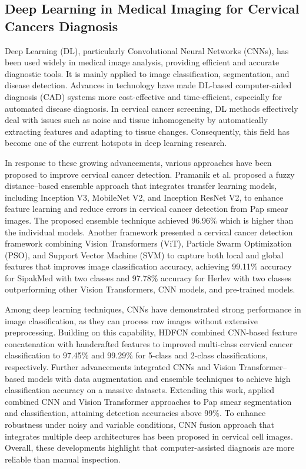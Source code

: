 \documentclass[pdflatex,sn-nature]{sn-jnl}%
\theoremstyle{thmstyleone}%
\theoremstyle{thmstyletwo}%
\theoremstyle{thmstylethree}%
\begin{document}
\subsection{Deep Learning in Medical Imaging for Cervical Cancers Diagnosis}

Deep Learning (DL), particularly Convolutional Neural Networks (CNNs), has been used widely in medical image analysis, providing efficient and accurate diagnostic tools. It is mainly applied to image classification, segmentation, and disease detection\cite{Lite7}. Advances in technology have made DL-based computer-aided diagnosis (CAD) systems more cost-effective and time-efficient, especially for automated disease diagnosis\cite{Lite8}. In cervical cancer screening, DL methods effectively deal with issues such as noise and tissue inhomogeneity by automatically extracting features and adapting to tissue changes\cite{Lite9}. Consequently, this field has become one of the current hotspots in deep learning research.

In response to these growing advancements, various approaches have been proposed to improve cervical cancer detection. Pramanik et al.\cite{Lite10} proposed a fuzzy distance–based ensemble approach that integrates transfer learning models, including Inception V3, MobileNet V2, and Inception ResNet V2, to enhance feature learning and reduce errors in cervical cancer detection from Pap smear images. The proposed ensemble technique achieved 96.96\% which is higher than the individual models. Another framework\cite{Lite11} presented a cervical cancer detection framework combining Vision Transformers (ViT), Particle Swarm Optimization (PSO), and Support Vector Machine (SVM) to capture both local and global features that improves image classification accuracy, achieving 99.11\% accuracy for SipakMed with two classes and 97.78\% accuracy for Herlev with two classes outperforming other Vision Transformers, CNN models, and pre-trained models. 

Among deep learning techniques, CNNs have demonstrated strong performance in image classification, as they can process raw images without extensive preprocessing. Building on this capability, HDFCN\cite{Lite12} combined CNN-based feature concatenation with handcrafted features to improved multi-class cervical cancer classification to 97.45\% and 99.29\% for 5-class and 2-class classifications, respectively. Further advancements integrated CNNs and Vision Transformer–based models with data augmentation and ensemble techniques to achieve high classification accuracy on a massive datasets\cite{Lite13}. Extending this work, \cite{Lite14}applied combined CNN and Vision Transformer approaches to Pap smear segmentation and classification, attaining detection accuracies above 99\%. To enhance robustness under noisy and variable conditions, CNN fusion approach that integrates multiple deep architectures has been proposed in cervical cell images\cite{Lite15}. Overall, these developments highlight that computer-assisted diagnosis are more reliable than manual inspection.
\end{document}
